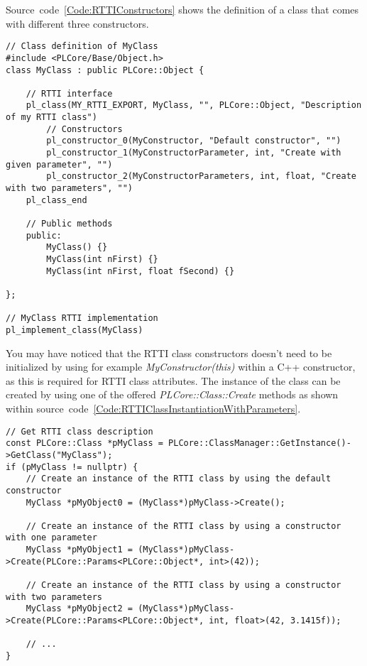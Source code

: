 Source~code~\ref{Code:RTTIConstructors} shows the definition of a class that comes with different three constructors.
\begin{lstlisting}[label=Code:RTTIConstructors,caption={\ac{RTTI} class constructors with parameters}]
// Class definition of MyClass
#include <PLCore/Base/Object.h>
class MyClass : public PLCore::Object {

	// RTTI interface
	pl_class(MY_RTTI_EXPORT, MyClass, "", PLCore::Object, "Description of my RTTI class")
		// Constructors
		pl_constructor_0(MyConstructor, "Default constructor", "")
		pl_constructor_1(MyConstructorParameter, int, "Create with given parameter", "")
		pl_constructor_2(MyConstructorParameters, int, float, "Create with two parameters", "")
	pl_class_end

	// Public methods
	public:
		MyClass() {}
		MyClass(int nFirst) {}
		MyClass(int nFirst, float fSecond) {}

};

// MyClass RTTI implementation
pl_implement_class(MyClass)
\end{lstlisting}
You may have noticed that the \ac{RTTI} class constructors doesn't need to be initialized by using for example \emph{MyConstructor(this)} within a C++ constructor, as this is required for \ac{RTTI} class attributes. The instance of the class can be created by using one of the offered \emph{PLCore::Class::Create} methods as shown within source~code~\ref{Code:RTTIClassInstantiationWithParameters}.
\begin{lstlisting}[label=Code:RTTIClassInstantiationWithParameters,caption={\ac{RTTI} class instantiation with parameters}]
// Get RTTI class description
const PLCore::Class *pMyClass = PLCore::ClassManager::GetInstance()->GetClass("MyClass");
if (pMyClass != nullptr) {
	// Create an instance of the RTTI class by using the default constructor
	MyClass *pMyObject0 = (MyClass*)pMyClass->Create();

	// Create an instance of the RTTI class by using a constructor with one parameter
	MyClass *pMyObject1 = (MyClass*)pMyClass->Create(PLCore::Params<PLCore::Object*, int>(42));

	// Create an instance of the RTTI class by using a constructor with two parameters
	MyClass *pMyObject2 = (MyClass*)pMyClass->Create(PLCore::Params<PLCore::Object*, int, float>(42, 3.1415f));

	// ...
}
\end{lstlisting}
